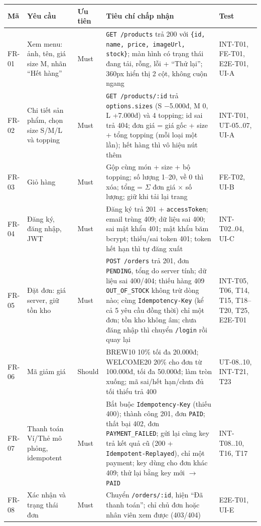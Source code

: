 \documentclass[a4paper]{article}
\newcommand{\st}[1]{\texttt{#1}}
\newcommand{\ra}{\ensuremath{\rightarrow}}
\begin{document}
{\small
\begin{longtable}{|L{1.1cm}|L{3.3cm}|L{1.15cm}|L{6.6cm}|L{2.2cm}|}
\hline
\textbf{Mã} & \textbf{Yêu cầu} & \textbf{Ưu tiên} & \textbf{Tiêu chí chấp nhận} & \textbf{Test} \\ \hline
\endhead
FR-01 & Xem menu: ảnh, tên, giá size M, nhãn ``Hết hàng'' & Must & \st{GET /products} trả 200 với \st{\{id, name, price, imageUrl, stock\}}; màn hình có trạng thái đang tải, rỗng, lỗi + ``Thử lại''; 360px hiển thị 2 cột, không cuộn ngang & INT-T01, FE-T01, E2E-T01, UI-A \\ \hline
FR-02 & Chi tiết sản phẩm, chọn size S/M/L và topping & Must & \st{GET /products/:id} trả \st{options.sizes} (S $-$5.000đ, M 0, L +7.000đ) và 4 topping; id sai trả 404; đơn giá = giá gốc + size + tổng topping (mỗi loại một lần); hết hàng thì vô hiệu nút thêm & INT-T01, UT-05..07, UI-A \\ \hline
FR-03 & Giỏ hàng & Must & Gộp cùng món + size + bộ topping; số lượng 1--20, về 0 thì xóa; tổng = $\Sigma$ đơn giá $\times$ số lượng; giữ khi tải lại trang & FE-T02, UI-B \\ \hline
FR-04 & Đăng ký, đăng nhập, JWT & Must & Đăng ký trả 201 + \st{accessToken}; email trùng 409; dữ liệu sai 400; sai mật khẩu 401; mật khẩu băm bcrypt; thiếu/sai token 401; token hết hạn thì tự đăng xuất & INT-T02..04, UI-C \\ \hline
FR-05 & Đặt đơn: giá server, giữ tồn kho & Must & \st{POST /orders} trả 201, đơn \st{PENDING}, tổng do server tính; dữ liệu sai 400/404; thiếu hàng 409 \st{OUT\_OF\_STOCK} không trừ dòng nào; cùng \st{Idempotency-Key} (kể cả 5 yêu cầu đồng thời) chỉ một đơn; tồn kho không âm; chưa đăng nhập thì chuyển \st{/login} rồi quay lại & INT-T05, T06, T14, T15, T18--T20, T25, E2E-T01 \\ \hline
FR-06 & Mã giảm giá & Should & BREW10 10\% tối đa 20.000đ; WELCOME20 20\% cho đơn từ 100.000đ, tối đa 50.000đ; làm tròn xuống; mã sai/hết hạn/chưa đủ tối thiểu trả 400 & UT-08..10, INT-T21, T23 \\ \hline
FR-07 & Thanh toán Ví/Thẻ mô phỏng, idempotent & Must & Bắt buộc \st{Idempotency-Key} (thiếu 400); thành công 201, đơn \st{PAID}; thất bại 402, đơn \st{PAYMENT\_FAILED}; gửi lại cùng key trả kết quả cũ (200 + \st{Idempotent-Replayed}), chỉ một payment; key dùng cho đơn khác 409; thử lại bằng key mới \ra{} \st{PAID} & INT-T08..10, T16, T17 \\ \hline
FR-08 & Xác nhận và trạng thái đơn & Must & Chuyển \st{/orders/:id}, hiện ``Đã thanh toán''; chỉ chủ đơn hoặc nhân viên xem được (403/404) & E2E-T01, UI-E \\ \hline

\end{longtable}}
\end{document}
